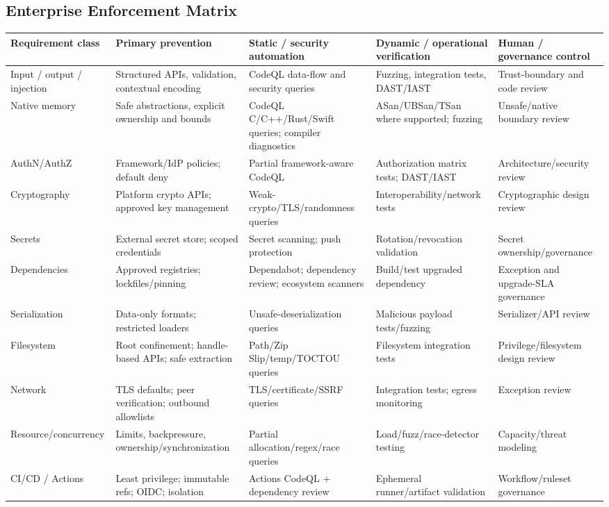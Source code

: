 \documentclass[10pt,letterpaper]{article}
\begin{document}
\begin{landscape}
\section{Enterprise Enforcement Matrix}
\scriptsize
\setlength{\tabcolsep}{3pt}
\begin{longtable}{@{}P{1.2in}P{1.75in}P{2.0in}P{1.85in}P{1.65in}@{}}
\toprule
\textbf{Requirement class} & \textbf{Primary prevention} & \textbf{Static / security automation} & \textbf{Dynamic / operational verification} & \textbf{Human / governance control}\\
\midrule
Input / output / injection & Structured APIs, validation, contextual encoding & CodeQL data-flow and security queries & Fuzzing, integration tests, DAST/IAST & Trust-boundary and code review\\
Native memory & Safe abstractions, explicit ownership and bounds & CodeQL C/C++/Rust/Swift queries; compiler diagnostics & ASan/UBSan/TSan where supported; fuzzing & Unsafe/native boundary review\\
AuthN/AuthZ & Framework/IdP policies; default deny & Partial framework-aware CodeQL & Authorization matrix tests; DAST/IAST & Architecture/security review\\
Cryptography & Platform crypto APIs; approved key management & Weak-crypto/TLS/randomness queries & Interoperability/network tests & Cryptographic design review\\
Secrets & External secret store; scoped credentials & Secret scanning; push protection & Rotation/revocation validation & Secret ownership/governance\\
Dependencies & Approved registries; lockfiles/pinning & Dependabot; dependency review; ecosystem scanners & Build/test upgraded dependency & Exception and upgrade-SLA governance\\
Serialization & Data-only formats; restricted loaders & Unsafe-deserialization queries & Malicious payload tests/fuzzing & Serializer/API review\\
Filesystem & Root confinement; handle-based APIs; safe extraction & Path/Zip Slip/temp/TOCTOU queries & Filesystem integration tests & Privilege/filesystem design review\\
Network & TLS defaults; peer verification; outbound allowlists & TLS/certificate/SSRF queries & Integration tests; egress monitoring & Exception review\\
Resource/concurrency & Limits, backpressure, ownership/synchronization & Partial allocation/regex/race queries & Load/fuzz/race-detector testing & Capacity/threat modeling\\
CI/CD / Actions & Least privilege; immutable refs; OIDC; isolation & Actions CodeQL + dependency review & Ephemeral runner/artifact validation & Workflow/ruleset governance\\
\bottomrule
\end{longtable}
\end{landscape}
\normalsize
\clearpage
\end{document}
